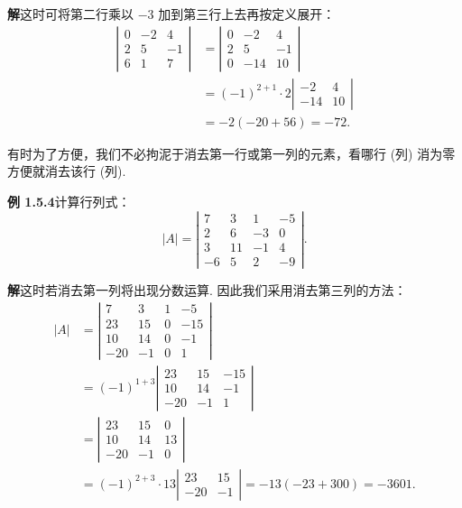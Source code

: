 \documentclass[UTF8, 12pt, fontset=fandol, oneside]{ctexart}
\begin{document}
\noindent\textbf{解}\quad 这时可将第二行乘以 $-3$ 加到第三行上去再按定义展开：
\[
\begin{aligned}
\left|\begin{array}{rrr}
0 & -2 & 4\\
2 & 5 & -1\\
6 & 1 & 7
\end{array}\right|
&=
\left|\begin{array}{rrr}
0 & -2 & 4\\
2 & 5 & -1\\
0 & -14 & 10
\end{array}\right|\\
&=(-1)^{2+1}\cdot 2
\left|\begin{array}{rr}
-2 & 4\\
-14 & 10
\end{array}\right|\\
&=-2(-20+56)=-72.
\end{aligned}
\]

有时为了方便，我们不必拘泥于消去第一行或第一列的元素，看哪行 (列) 消为零方便就消去该行 (列).

\noindent\textbf{例 1.5.4}\quad 计算行列式：
\[
|A|=
\left|\begin{array}{rrrr}
7 & 3 & 1 & -5\\
2 & 6 & -3 & 0\\
3 & 11 & -1 & 4\\
-6 & 5 & 2 & -9
\end{array}\right|.
\]

\noindent\textbf{解}\quad 这时若消去第一列将出现分数运算. 因此我们采用消去第三列的方法：
\[
\begin{aligned}
|A|
&=
\left|\begin{array}{rrrr}
7 & 3 & 1 & -5\\
23 & 15 & 0 & -15\\
10 & 14 & 0 & -1\\
-20 & -1 & 0 & 1
\end{array}\right|\\
&=(-1)^{1+3}
\left|\begin{array}{rrr}
23 & 15 & -15\\
10 & 14 & -1\\
-20 & -1 & 1
\end{array}\right|\\
&=
\left|\begin{array}{rrr}
23 & 15 & 0\\
10 & 14 & 13\\
-20 & -1 & 0
\end{array}\right|\\
&=(-1)^{2+3}\cdot 13
\left|\begin{array}{rr}
23 & 15\\
-20 & -1
\end{array}\right|
=-13(-23+300)=-3601.
\end{aligned}
\]
\end{document}
